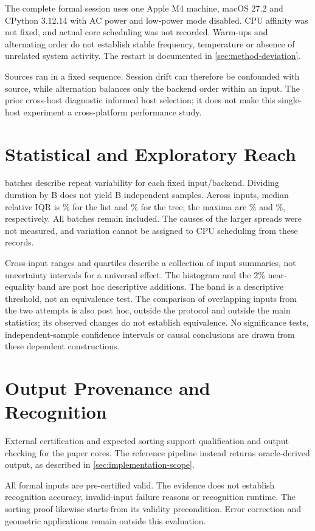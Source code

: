 The complete formal session uses one Apple M4 machine, macOS 27.2 and
CPython 3.12.14 with AC power and low-power mode disabled. CPU affinity was
not fixed, and actual core scheduling was not recorded. Warm-ups and
alternating order do not establish stable frequency, temperature or absence
of unrelated system activity. The restart is documented in
\cref{sec:method-deviation}.

Sources ran in a fixed sequence. Session drift can therefore be confounded
with source, while alternation balances only the backend order within an
input. The prior cross-host diagnostic informed host selection; it does not
make this single-host experiment a cross-platform performance study.

\section{Statistical and Exploratory Reach}
\label{sec:limitations-statistics}
\label{sec:limitations-exploratory}

\UnifiedRounds{} batches describe repeat variability for each fixed
input/backend. Dividing duration by B does not yield B independent samples.
Across inputs, median relative IQR is \UnifiedListIQRMedian{}\% for the list
and \UnifiedTreeIQRMedian{}\% for the tree; the maxima are
\UnifiedListIQRMax{}\% and \UnifiedTreeIQRMax{}\%, respectively. All batches
remain included. The causes of the larger spreads were not measured, and
variation cannot be assigned to CPU scheduling from these records.

Cross-input ranges and quartiles describe a collection of input summaries,
not uncertainty intervals for a universal effect. The histogram and the
2\% near-equality band are post hoc descriptive additions. The band is a
descriptive threshold, not an equivalence test. The comparison of
\UnifiedStabilityN{} overlapping inputs from the two attempts is also post hoc,
outside the protocol and outside the main statistics; its observed changes do
not establish equivalence. No significance tests, independent-sample confidence
intervals or causal conclusions are drawn from these dependent constructions.

\section{Output Provenance and Recognition}
\label{sec:limitations-provenance}

External certification and expected sorting support qualification and output
checking for the paper cores. The reference pipeline instead returns
oracle-derived output, as described in \cref{sec:implementation-scope}.

All formal inputs are pre-certified valid. The evidence does not establish
recognition accuracy, invalid-input failure reasons or recognition runtime.
The sorting proof likewise starts from its validity precondition. Error
correction and geometric applications remain outside this evaluation.

\label{sec:limitations-conclusions}
